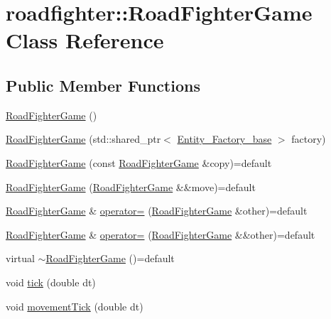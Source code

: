\hypertarget{classroadfighter_1_1RoadFighterGame}{}\section{roadfighter\+:\+:Road\+Fighter\+Game Class Reference}
\label{classroadfighter_1_1RoadFighterGame}
\subsection*{Public Member Functions}
\begin{DoxyCompactItemize}
\item 
\hyperlink{classroadfighter_1_1RoadFighterGame_a53d3c84fb27feef4e698e5d0e9f0a59a}{Road\+Fighter\+Game} ()
\item 
\hyperlink{classroadfighter_1_1RoadFighterGame_acb54c946b0897a01fe2c165ea7e6e386}{Road\+Fighter\+Game} (std\+::shared\+\_\+ptr$<$ \hyperlink{classroadfighter_1_1Entity__Factory__base}{Entity\+\_\+\+Factory\+\_\+base} $>$ factory)
\item 
\hyperlink{classroadfighter_1_1RoadFighterGame_a972a332abf53705ac2e6b11cf4c446aa}{Road\+Fighter\+Game} (const \hyperlink{classroadfighter_1_1RoadFighterGame}{Road\+Fighter\+Game} \&copy)=default
\item 
\hyperlink{classroadfighter_1_1RoadFighterGame_ad5801b8550efd5b3c8b2029b5b11bd34}{Road\+Fighter\+Game} (\hyperlink{classroadfighter_1_1RoadFighterGame}{Road\+Fighter\+Game} \&\&move)=default
\item 
\hyperlink{classroadfighter_1_1RoadFighterGame}{Road\+Fighter\+Game} \& \hyperlink{classroadfighter_1_1RoadFighterGame_a2bfbab81a2304aa6c1e27571720ec431}{operator=} (\hyperlink{classroadfighter_1_1RoadFighterGame}{Road\+Fighter\+Game} \&other)=default
\item 
\hyperlink{classroadfighter_1_1RoadFighterGame}{Road\+Fighter\+Game} \& \hyperlink{classroadfighter_1_1RoadFighterGame_a8887e487ce6d91da4c380eee1d3d7051}{operator=} (\hyperlink{classroadfighter_1_1RoadFighterGame}{Road\+Fighter\+Game} \&\&other)=default
\item 
virtual \hyperlink{classroadfighter_1_1RoadFighterGame_ab7e8842d97c76acc3898eaab6ebacb69}{$\sim$\+Road\+Fighter\+Game} ()=default
\item 
void \hyperlink{classroadfighter_1_1RoadFighterGame_a1bbb706a128d1f98e06ea5e0f6ab1581}{tick} (double dt)
\item 
void \hyperlink{classroadfighter_1_1RoadFighterGame_aa9b7ba207f49c736dd933b51096a25a9}{movement\+Tick} (double dt)

\end{DoxyCompactItemize}
